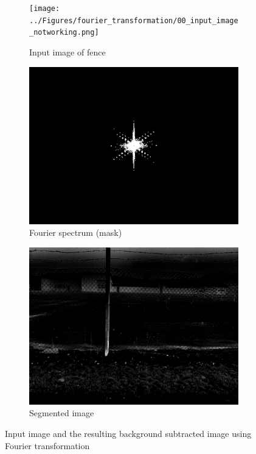 \documentclass[../Head/Main.tex]{subfiles}
\begin{document}
\begin{figure}[H]
    \centering
    \begin{subfigure}{.32\textwidth}
        \centering
        \texttt{[image: ../Figures/fourier\_transformation/00\_input\_image\_notworking.png]}
        \caption{Input image of fence}
        \label{fig:input_image_breach_notworking}
    \end{subfigure}
    \hfill
    \begin{subfigure}{.32\textwidth}
        \centering
        \includegraphics[width=\textwidth]{../Figures/fourier_transformation/07_shifted_fft_peak_mask_notworkning.png}
        \caption{Fourier spectrum (mask)}
        \label{fig:fouier_mask_with_breaches_notworking}
    \end{subfigure}
    \hfill
    \begin{subfigure}{.32\textwidth}
        \centering
        \includegraphics[width=\textwidth]{../Figures/fourier_transformation/20_low_pass_filtered_image_notworking.png}
        \caption{Segmented image}
        \label{fig:fourier_detected_with_breaches_notworking}
    \end{subfigure}    
    \caption{Input image and the resulting background subtracted image using Fourier transformation}
\end{figure}
\end{document}
